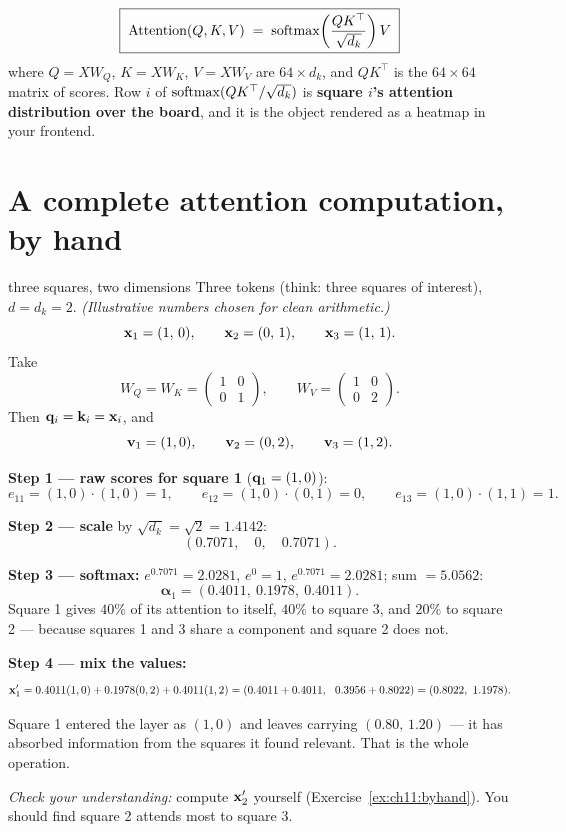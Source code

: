 \begin{finalform}
\begin{equation}
  \label{eq:attention}
  \boxed{\;
  \text{Attention}(Q,K,V) \;=\; \operatorname{softmax}\!\left(\frac{QK^{\top}}{\sqrt{d_k}}\right)V
  \;}
\end{equation}
where $Q = XW_Q$, $K = XW_K$, $V = XW_V$ are $64\times d_k$, and $QK^{\top}$ is the
$64\times64$ matrix of scores. Row $i$ of $\operatorname{softmax}(QK^\top/\sqrt{d_k})$ is \textbf{square
$i$'s attention distribution over the board}, and it is the object rendered as a heatmap in
your frontend.
\end{finalform}

\section{A complete attention computation, by hand}

\begin{worked}{three squares, two dimensions}
Three tokens (think: three squares of interest), $d = d_k = 2$.
\emph{(Illustrative numbers chosen for clean arithmetic.)}
\[
\mathbf{x}_1 = (1,\,0), \qquad \mathbf{x}_2 = (0,\,1), \qquad \mathbf{x}_3 = (1,\,1).
\]
Take
\[
W_Q = W_K = \begin{pmatrix}1&0\\0&1\end{pmatrix},
\qquad
W_V = \begin{pmatrix}1&0\\0&2\end{pmatrix}.
\]
Then $\mathbf{q}_i = \mathbf{k}_i = \mathbf{x}_i$, and
\[
\mathbf{v}_1 = (1,0),\qquad \mathbf{v}_2 = (0,2),\qquad \mathbf{v}_3 = (1,2).
\]

\textbf{Step 1 --- raw scores for square 1} ($\mathbf{q}_1 = (1,0)$):
\[
e_{11} = (1,0)\cdot(1,0) = 1,\qquad
e_{12} = (1,0)\cdot(0,1) = 0,\qquad
e_{13} = (1,0)\cdot(1,1) = 1 .
\]

\textbf{Step 2 --- scale} by $\sqrt{d_k} = \sqrt{2} = 1.4142$:
\[
(0.7071,\quad 0,\quad 0.7071).
\]

\textbf{Step 3 --- softmax:} $e^{0.7071} = 2.0281$, $e^{0} = 1$, $e^{0.7071} = 2.0281$;
sum $= 5.0562$:
\[
\boldsymbol{\alpha}_1 = (0.4011,\ 0.1978,\ 0.4011).
\]
Square 1 gives $40\%$ of its attention to itself, $40\%$ to square 3, and $20\%$ to square 2
--- because squares 1 and 3 share a component and square 2 does not.

\textbf{Step 4 --- mix the values:}
\[
\mathbf{x}_1' = 0.4011(1,0) + 0.1978(0,2) + 0.4011(1,2)
         = (0.4011 + 0.4011,\ \ 0.3956 + 0.8022)
         = (0.8022,\ 1.1978).
\]

Square 1 entered the layer as $(1,0)$ and leaves carrying $(0.80,\,1.20)$ --- it has absorbed
information from the squares it found relevant. That is the whole operation.

\smallskip
\emph{Check your understanding:} compute $\mathbf{x}_2'$ yourself (Exercise~\ref{ex:ch11:byhand}).
You should find square 2 attends most to square 3.
\end{worked}

